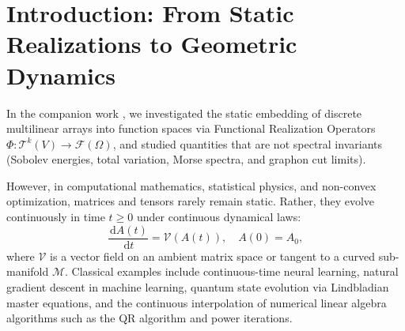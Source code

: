 \documentclass[11pt,a4paper,reqno]{amsart}
\theoremstyle{definition}
\numberwithin{equation}{section}
\newcommand{\dif}{\,\mathrm{d}}
\begin{document}
\tableofcontents

\newpage

\section{Introduction: From Static Realizations to Geometric Dynamics}
\label{sec:intro}

In the companion work \cite{silvafilho2026functional}, we investigated the static embedding of discrete multilinear arrays into function spaces via Functional Realization Operators $\Phi \colon \mathcal{T}^k(V) \to \mathcal{F}(\Omega)$, and studied quantities that are not spectral invariants (Sobolev energies, total variation, Morse spectra, and graphon cut limits). 

However, in computational mathematics, statistical physics, and non-convex optimization, matrices and tensors rarely remain static. Rather, they evolve continuously in time $t \ge 0$ under continuous dynamical laws:
\begin{equation}
    \label{eq:matrix_ode_general}
    \frac{\dif A(t)}{\dif t} = \mathcal{V}(A(t)), \quad A(0) = A_0,
\end{equation}
where $\mathcal{V}$ is a vector field on an ambient matrix space or tangent to a curved sub-manifold $\mathcal{M}$. Classical examples include continuous-time neural learning, natural gradient descent in machine learning, quantum state evolution via Lindbladian master equations, and the continuous interpolation of numerical linear algebra algorithms such as the QR algorithm and power iterations.
\end{document}
